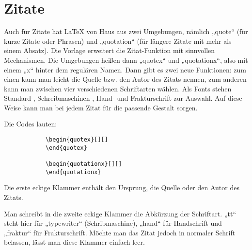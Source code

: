 			\newline

		\section{Zitate}

			Auch für Zitate hat \LaTeX{} von Haus aus zwei Umgebungen, nämlich „quote“ (für kurze Zitate oder Phrasen) und „quotation“ (für längere Zitate mit mehr als einem Absatz). Die Vorlage erweitert die Zitat-Funktion mit sinnvollen Mechanismen. Die Umgebungen heißen dann „quotex“ und „quotationx“, also mit einem „x“ hinter dem regulären Namen. Dann gibt es zwei neue Funktionen: zum einen kann man leicht die Quelle bzw. den Autor des Zitats nennen, zum anderen kann man zwischen vier verschiedenen Schriftarten wählen. Als Fonts stehen Standard-, Schreibmaschinen-, Hand- und Frakturschrift zur Auswahl. Auf diese Weise kann man bei jedem Zitat für die passende Gestalt sorgen.

			Die Codes lauten:

			\begin{verbatim}
			\begin{quotex}[][]
			\end{quotex}

			\begin{quotationx}[][]
			\end{quotationx}
			\end{verbatim}\newline

			Die erste eckige Klammer enthält den Ursprung, die Quelle oder den Autor des Zitats.

			Man schreibt in die zweite eckige Klammer die Abkürzung der Schriftart. „tt“ steht hier für „typewriter“ (Schribmaschine), „hand“ für Handschrift und „fraktur“ für Frakturschrift. Möchte man das Zitat jedoch in normaler Schrift belassen, lässt man diese Klammer einfach leer.

